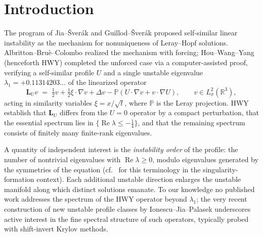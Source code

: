 \documentclass[11pt]{article}
\newcommand{\R}{\mathbb{R}}
\newcommand{\Lsig}{L^2_\sigma(\R^3)}
\newcommand{\LU}{\mathbf{L}_{U}}
\theoremstyle{plain}
\theoremstyle{remark}
\begin{document}
\section{Introduction}
The program of Jia--\v{S}ver\'ak \cite{JS15} and Guillod--\v{S}ver\'ak
\cite{GS17} proposed self-similar linear instability as the mechanism for
nonuniqueness of Leray--Hopf solutions. Albritton--Bru\`e--Colombo
\cite{ABC22} realized the mechanism with forcing; Hou--Wang--Yang
\cite{HWY25} (henceforth HWY) completed the unforced case via a
computer-assisted proof, verifying a self-similar profile $U$ and a
single unstable eigenvalue $\lambda_1 = +0.11314203\ldots$ of the
linearized operator
\begin{equation}\label{eq:LU}
\LU v \;=\; \tfrac12 v + \tfrac12 \xi\!\cdot\!\nabla v + \Delta v
- \mathbb{P}\left( U\!\cdot\!\nabla v + v\!\cdot\!\nabla U \right),
\qquad v \in \Lsig ,
\end{equation}
acting in similarity variables $\xi = x/\sqrt{t}$, where $\mathbb{P}$ is
the Leray projection. HWY establish that $\LU$ differs from the $U=0$
operator by a compact perturbation, that the essential spectrum lies in
$\{\operatorname{Re}\lambda \le -\tfrac14\}$, and that the remaining
spectrum consists of finitely many finite-rank eigenvalues.

A quantity of independent interest is the \emph{instability order} of
the profile: the number of nontrivial eigenvalues with
$\operatorname{Re}\lambda \ge 0$, modulo eigenvalues generated by the
symmetries of the equation (cf.~\cite{WLGSB25} for this terminology in
the singularity-formation context). Each additional unstable direction
enlarges the unstable manifold along which distinct solutions emanate.
To our knowledge no published work addresses the spectrum of the HWY
operator beyond $\lambda_1$; the very recent construction of new
unstable profile classes by Ionescu--Jia--Palasek \cite{IJP26}
underscores active interest in the fine spectral structure of such
operators, typically probed with shift-invert Krylov methods.
\end{document}
